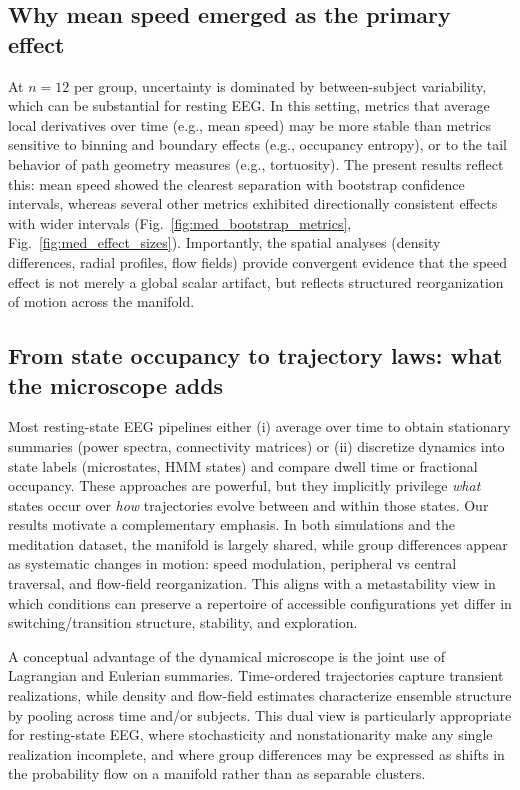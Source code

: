 \documentclass[5p,twocolumn,authoryear]{elsarticle}
\newcommand{\figref}[1]{Fig.~\ref{#1}}
\begin{document}
\subsection{Why mean speed emerged as the primary effect}
At $n=12$ per group, uncertainty is dominated by between-subject variability, which can be substantial for resting EEG. In this setting, metrics that average local derivatives over time (e.g., mean speed) may be more stable than metrics sensitive to binning and boundary effects (e.g., occupancy entropy), or to the tail behavior of path geometry measures (e.g., tortuosity). The present results reflect this: mean speed showed the clearest separation with bootstrap confidence intervals, whereas several other metrics exhibited directionally consistent effects with wider intervals (\figref{fig:med_bootstrap_metrics}, \figref{fig:med_effect_sizes}). Importantly, the spatial analyses (density differences, radial profiles, flow fields) provide convergent evidence that the speed effect is not merely a global scalar artifact, but reflects structured reorganization of motion across the manifold.

\subsection{From state occupancy to trajectory laws: what the microscope adds}
Most resting-state EEG pipelines either (i) average over time to obtain stationary summaries (power spectra, connectivity matrices) or (ii) discretize dynamics into state labels (microstates, HMM states) and compare dwell time or fractional occupancy. These approaches are powerful, but they implicitly privilege \emph{what} states occur over \emph{how} trajectories evolve between and within those states. Our results motivate a complementary emphasis. In both simulations and the meditation dataset, the manifold is largely shared, while group differences appear as systematic changes in motion: speed modulation, peripheral vs central traversal, and flow-field reorganization. This aligns with a metastability view in which conditions can preserve a repertoire of accessible configurations yet differ in switching/transition structure, stability, and exploration.

A conceptual advantage of the dynamical microscope is the joint use of Lagrangian and Eulerian summaries. Time-ordered trajectories capture transient realizations, while density and flow-field estimates characterize ensemble structure by pooling across time and/or subjects. This dual view is particularly appropriate for resting-state EEG, where stochasticity and nonstationarity make any single realization incomplete, and where group differences may be expressed as shifts in the probability flow on a manifold rather than as separable clusters.
\end{document}
